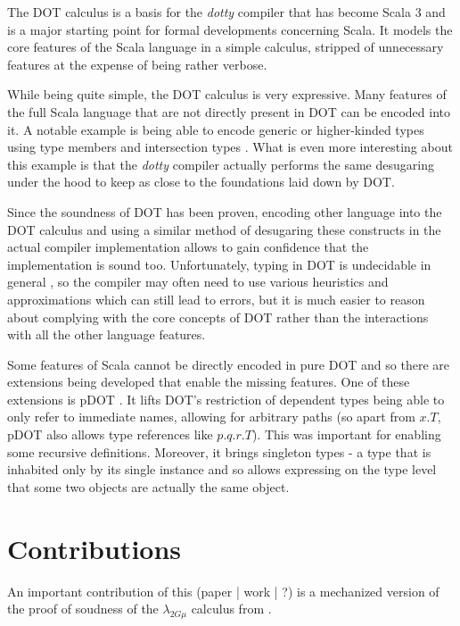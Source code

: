 The DOT calculus is a basis for the \textit{dotty} compiler that has become Scala 3 and is a major starting point for formal developments concerning Scala. It models the core features of the Scala language in a simple calculus, stripped of unnecessary features at the expense of being rather verbose.

While being quite simple, the DOT calculus is very expressive. Many features of the full Scala language that are not directly present in DOT can be encoded into it. A notable example is being able to encode generic or higher-kinded types using type members and intersection types \cite{HKTDOT}. What is even more interesting about this example is that the \textit{dotty} compiler actually performs the same desugaring under the hood to keep as close to the foundations laid down by DOT.

Since the soundness of DOT has been proven, encoding other language into the DOT calculus and using a similar method of desugaring these constructs in the actual compiler implementation allows to gain confidence that the implementation is sound too. Unfortunately, typing in DOT is undecidable in general \cite{?}, so the compiler may often need to use various heuristics and approximations which can still lead to errors, but it is much easier to reason about complying with the core concepts of DOT rather than the interactions with all the other language features.

Some features of Scala cannot be directly encoded in pure DOT and so there are extensions being developed that enable the missing features. One of these extensions is pDOT \cite{pDOT}. It lifts DOT's restriction of dependent types being able to only refer to immediate names, allowing for arbitrary paths (so apart from $x.T$, pDOT also allows type references like $p.q.r.T$). This was important for enabling some recursive definitions. Moreover, it brings singleton types - a type that is inhabited only by its single instance and so allows expressing on the type level that some two objects are actually the same object.

  

\section{Contributions}


An important contribution of this (paper | work | ?) is a mechanized version of the proof of soudness of the $\lambda_{2G\mu}$ calculus from \cite{XiGRDT}.